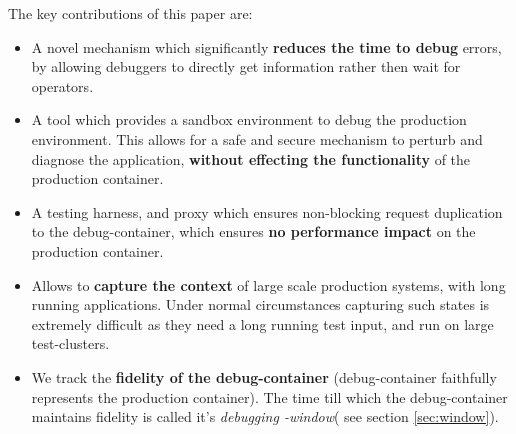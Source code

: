 \noindent
The key contributions of this paper are:
\begin{itemize}[leftmargin=*,topsep=0pt,itemsep=-1ex,partopsep=1ex,parsep=1ex]
\item A novel mechanism which significantly \textbf{reduces the time to debug} errors, by allowing debuggers to directly get information rather then wait for operators.
\item A tool which provides a sandbox environment to debug the production environment. 
This allows for a safe and secure mechanism to perturb and diagnose the application, \textbf{without effecting the functionality} of the  production container.
\item A testing harness, and proxy which ensures non-blocking request duplication to the debug-container, which ensures \textbf{no performance impact} on the production container. 
\item Allows to \textbf{capture the context} of large scale production systems, with long running applications. Under normal circumstances capturing such states is extremely difficult as they need a long running test input, and run on large test-clusters.
\item We track the \textbf{fidelity of the debug-container} (debug-container faithfully represents the production container). 
The time till which the debug-container maintains fidelity is called it's \emph{debugging -window}( see section \ref{sec:window}).


\end{itemize}

